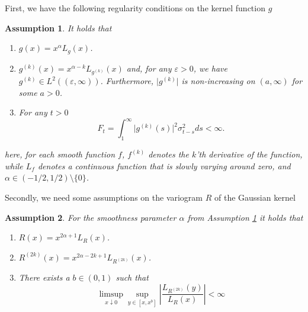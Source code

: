\documentclass[fleqn,11pt,letterpaper]{article}
\theoremstyle{plain}
\newtheorem{assumption}{Assumption}[section]
\theoremstyle{definition}
\theoremstyle{remark}
\newtheorem{remark}{Remark}[section]
\numberwithin{equation}{section}
\begin{document}
First, we have the following regularity conditions on the kernel function $g$
\begin{assumption}\label{assumption:kernel}
It holds that
\begin{enumerate}
    \item $g(x)=x^\alpha L_g(x)$.
    \item $g^{(k)}(x)=x^{\alpha-k}L_{g^{(k)}}(x)$ and, for any $\varepsilon>0$, we have $g^{(k)}\in L^2((\varepsilon,\infty))$. Furthermore, $\vert g^{(k)}\vert$ is non-increasing on $(a,\infty)$ for some $a>0$.
    \item For any $t>0$
    \begin{equation}
        F_t=\int_1^\infty\vert g^{(k)}(s)\vert^2\sigma_{t-s}^2ds<\infty.
    \end{equation}
\end{enumerate}
here, for each smooth function $f$, $f^{(k)}$ denotes the $k$'th derivative of the function, while $L_f$ denotes a continuous function that is slowly varying around zero, and $\alpha\in(-1/2,1/2)\setminus\{0\}$.
\end{assumption}

Secondly, we need some assumptions on the variogram $R$ of the Gaussian kernel
\begin{assumption}\label{assumption:variogram}
For the smoothness parameter $\alpha$ from Assumption \ref{assumption:kernel} it holds that
\begin{enumerate}
    \item $R(x)=x^{2\alpha+1}L_R(x)$.
    \item $R^{(2k)}(x)=x^{2\alpha-2k+1}L_{R^{(2k)}}(x)$.
    \item There exists a $b\in(0,1)$ such that 
    \begin{equation}
        \limsup_{x\downarrow0}\sup_{y\in[x,x^b]}\left\vert\frac{L_{R^{(2k)}}(y)}{L_R(x)}\right\vert<\infty
    \end{equation}
\end{enumerate}
\end{assumption}

\end{document}
